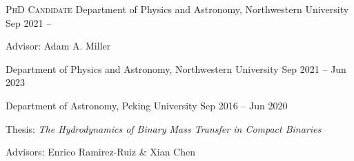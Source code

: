 


\begin{cventries}



\cvsimpentry
{{\scshape PhD Candidate}} %
{Department of Physics and Astronomy, Northwestern University} %
{Sep 2021 -- } %
{ \begin{cvitems}
	\item {Advisor: Adam A. Miller}
\end{cvitems}
}

\cvsimpentry
{} %
{Department of Physics and Astronomy, Northwestern University} %
{Sep 2021 -- Jun 2023} %
{}

\cvsimpentry
{} %
{Department of Astronomy, Peking University} %
{Sep 2016 -- Jun 2020} %
{ %
	\begin{cvitems}
		\item {Thesis: \textit{The Hydrodynamics of Binary Mass Transfer in Compact Binaries}}
		\item {Advisors: Enrico Ramirez-Ruiz \& Xian Chen}
	\end{cvitems}
}

\end{cventries}